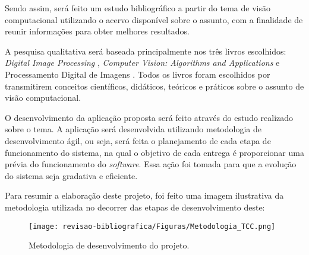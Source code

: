 Sendo assim, será feito um estudo bibliográfico a partir do tema de visão computacional utilizando o acervo disponível sobre o assunto, com a finalidade de reunir informações para obter melhores resultados.

A pesquisa qualitativa será baseada principalmente nos três livros escolhidos: \textit{Digital Image Processing} \cite{GONZALEZ2002},  \textit{Computer Vision: Algorithms and Applications} \cite{SZELISKI2010} e Processamento Digital de Imagens \cite{FILHO1999}. Todos os livros foram escolhidos por transmitirem conceitos científicos, didáticos, teóricos e práticos sobre o assunto de visão computacional.

O desenvolvimento da aplicação proposta será feito através do estudo realizado sobre o tema. A aplicação será desenvolvida utilizando metodologia de desenvolvimento ágil, ou seja, será feita o planejamento de cada etapa de funcionamento do sistema, na qual o objetivo de cada entrega é proporcionar uma prévia do funcionamento do \textit{software}. Essa ação foi tomada para que a evolução do sistema seja gradativa e eficiente.

Para resumir a elaboração deste projeto, foi feito uma imagem ilustrativa da metodologia utilizada no decorrer das etapas de desenvolvimento deste:

\clearpage
\begin{figure}[!htb]
\caption{ {\footnotesize Metodologia de desenvolvimento do projeto.}}
 
\centering %
\texttt{[image: revisao-bibliografica/Figuras/Metodologia\_TCC.png]}%
\label{figura:figuraMet}

\centering {}
{
\label{figura:figura7}
}
\end{figure}